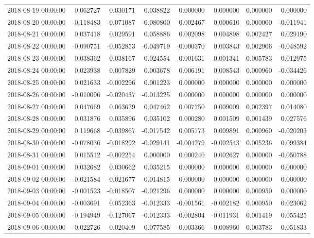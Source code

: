 \begin{tabular}{lrrrrrrr}
2018-08-19 00:00:00 & 0.062727 & 0.030171 & 0.038822 & 0.000000 & 0.000000 & 0.000000 & 0.000000 \\
2018-08-20 00:00:00 & -0.118483 & -0.071087 & -0.080800 & 0.002467 & 0.000610 & 0.000000 & -0.011941 \\
2018-08-21 00:00:00 & 0.037418 & 0.029591 & 0.058886 & 0.002098 & 0.004898 & 0.002427 & 0.029190 \\
2018-08-22 00:00:00 & -0.090751 & -0.052853 & -0.049719 & -0.000370 & 0.003843 & 0.002906 & -0.048592 \\
2018-08-23 00:00:00 & 0.038362 & 0.038167 & 0.024554 & -0.001631 & -0.001341 & 0.005783 & 0.012975 \\
2018-08-24 00:00:00 & 0.023938 & 0.007829 & 0.003678 & 0.006191 & 0.008543 & 0.000960 & -0.034426 \\
2018-08-25 00:00:00 & 0.021633 & -0.002296 & 0.001223 & 0.000000 & 0.000000 & 0.000000 & 0.000000 \\
2018-08-26 00:00:00 & -0.010096 & -0.020437 & -0.013225 & 0.000000 & 0.000000 & 0.000000 & 0.000000 \\
2018-08-27 00:00:00 & 0.047669 & 0.063629 & 0.047462 & 0.007750 & 0.009009 & 0.002397 & 0.014080 \\
2018-08-28 00:00:00 & 0.031876 & 0.035896 & 0.035102 & 0.000280 & 0.001509 & 0.001439 & 0.027576 \\
2018-08-29 00:00:00 & 0.119668 & -0.039867 & -0.017542 & 0.005773 & 0.009891 & 0.000960 & -0.020203 \\
2018-08-30 00:00:00 & -0.078036 & -0.018292 & -0.029141 & -0.004279 & -0.002543 & 0.005236 & 0.099384 \\
2018-08-31 00:00:00 & 0.015512 & -0.002254 & 0.000000 & 0.000240 & 0.002627 & 0.000000 & -0.050788 \\
2018-09-01 00:00:00 & 0.032682 & 0.030662 & 0.035215 & 0.000000 & 0.000000 & 0.000000 & 0.000000 \\
2018-09-02 00:00:00 & -0.021584 & -0.021677 & -0.014815 & 0.000000 & 0.000000 & 0.000000 & 0.000000 \\
2018-09-03 00:00:00 & -0.001523 & -0.018507 & -0.021296 & 0.000000 & 0.000000 & 0.000950 & 0.000000 \\
2018-09-04 00:00:00 & -0.003691 & 0.052363 & -0.012333 & -0.001561 & -0.002182 & 0.000950 & 0.023062 \\
2018-09-05 00:00:00 & -0.194949 & -0.127067 & -0.012333 & -0.002804 & -0.011931 & 0.001419 & 0.055425 \\
2018-09-06 00:00:00 & -0.022726 & 0.020409 & 0.077585 & -0.003366 & -0.008960 & 0.003783 & 0.051833 \\

\end{tabular}
